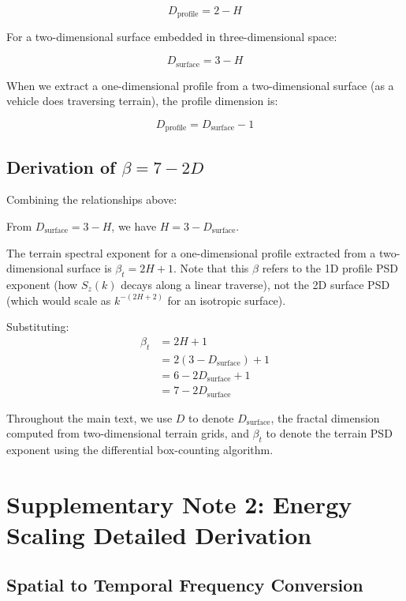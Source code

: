 \documentclass[11pt]{article}
\begin{document}
\begin{equation}
D_{\text{profile}} = 2 - H
\end{equation}

For a two-dimensional surface embedded in three-dimensional space:

\begin{equation}
D_{\text{surface}} = 3 - H
\end{equation}

When we extract a one-dimensional profile from a two-dimensional surface (as a vehicle does traversing terrain), the profile dimension is:

\begin{equation}
D_{\text{profile}} = D_{\text{surface}} - 1
\end{equation}

\subsection{Derivation of $\beta = 7-2D$}

Combining the relationships above:

From $D_{\text{surface}} = 3 - H$, we have $H = 3 - D_{\text{surface}}$.

The terrain spectral exponent for a one-dimensional profile extracted from a two-dimensional surface is $\beta_t = 2H + 1$. Note that this $\beta$ refers to the 1D profile PSD exponent (how $S_z(k)$ decays along a linear traverse), not the 2D surface PSD (which would scale as $k^{-(2H+2)}$ for an isotropic surface).

Substituting:
\begin{align}
\beta_t &= 2H + 1 \\
&= 2(3 - D_{\text{surface}}) + 1 \\
&= 6 - 2D_{\text{surface}} + 1 \\
&= 7 - 2D_{\text{surface}}
\end{align}

Throughout the main text, we use $D$ to denote $D_{\text{surface}}$, the fractal dimension computed from two-dimensional terrain grids, and $\beta_t$ to denote the terrain PSD exponent using the differential box-counting algorithm.

\section{Supplementary Note 2: Energy Scaling Detailed Derivation}

\subsection{Spatial to Temporal Frequency Conversion}
\end{document}
